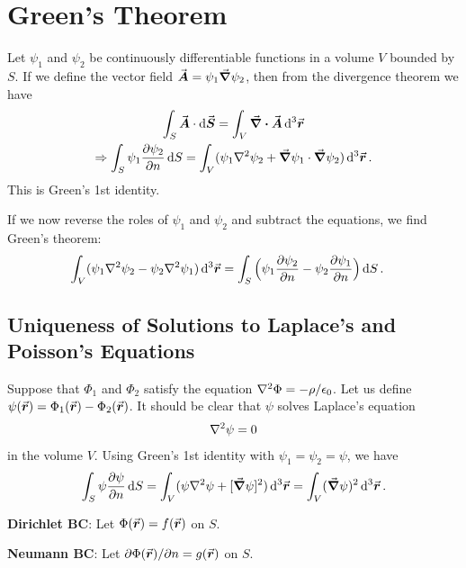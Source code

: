 \chapter{Green's Theorem}

Let $\psi_1$ and $\psi_2$ be continuously differentiable functions in a volume $V$ bounded by $S$.
If we define the vector field $\va*{A} = \psi_1 \grad \psi_2$, then from the divergence theorem we have
\begin{gather}
    \int_{S} \va*{A} \cdot \dd{\va*{S}} = \int_{V} \div{\va*{A}} \dd[3]{\va*{r}} \nonumber \\
    \Rightarrow \int_{S} \psi_1 \pdv{\psi_2}{n} \dd{S} = \int_{V} (\psi_1 \laplacian \psi_2 + \grad \psi_1 \cdot \grad \psi_2) \dd[3]{\va*{r}}
.\end{gather}
This is Green's 1st identity.

If we now reverse the roles of $\psi_1$ and $\psi_2$ and subtract the equations, we find Green's theorem:
\begin{align}
    \int_{V} ( \psi_1 \laplacian \psi_2 - \psi_2 \laplacian \psi_1 ) \dd[3]{\va*{r}} &= \int_{S} \Big( \psi_1 \pdv{\psi_2}{n} - \psi_2 \pdv{\psi_1}{n} \Big) \dd{S}
.\end{align}


\section{Uniqueness of Solutions to Laplace's and Poisson's Equations}

Suppose that $\Phi_1$ and $\Phi_2$ satisfy the equation $\laplacian \Phi = - \rho/\epsilon_0$.
Let us define $\psi(\va*{r}) = \Phi_1(\va*{r}) - \Phi_2(\va*{r})$.
It should be clear that $\psi$ solves Laplace's equation
\begin{eqnarray}
    \laplacian \psi = 0
\end{eqnarray}
in the volume $V$.
Using Green's 1st identity with $\psi_1 = \psi_2 = \psi$, we have
\begin{eqnarray}
    \label{eq:apply-G1}
    \int_{S} \psi \pdv{\psi}{n} \dd{S} = \int_{V} (\psi \laplacian \psi + [\grad \psi]^2) \dd[3]{\va*{r}} = \int_{V} (\grad \psi)^2 \dd[3]{\va*{r}}
.\end{eqnarray}



\textbf{Dirichlet BC}: Let $\Phi(\va*{r}) = f(\va*{r})$ on $S$.

\textbf{Neumann BC}: Let $\partial \Phi(\va*{r}) / \partial n = g(\va*{r})$ on $S$.

